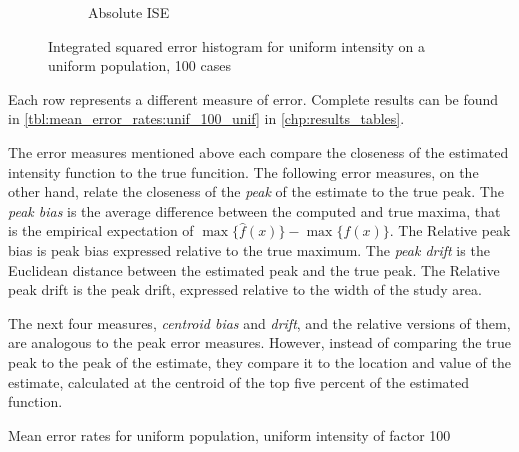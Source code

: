 \begin{figure}[htbp]
\begin{subfigure}[b]{0.45\textwidth}
    \caption{Absolute ISE}
    \end{subfigure}
    \caption[ISE: uniform on uniform]{Integrated squared error histogram for uniform intensity on a uniform population, 100 cases}
    \label{fig:ise:unif_100_unif}
\end{figure}

Each row represents a different measure of error.
Complete results can be found in \autoref{tbl:mean_error_rates:unif_100_unif} in \autoref{chp:results_tables}.

The error measures mentioned above each compare the closeness of the estimated intensity function to the true funcition.
The following error measures, on the other hand, relate the closeness of the \textit{peak} of the estimate to the true peak.
The \textit{peak bias} is the average difference between the computed and true maxima,
that is the empirical expectation of \(\max{\{\hat{f}(x)\}} - \max{\{f(x)\}}\).
The Relative peak bias is peak bias expressed relative to the true maximum.
The \textit{peak drift} is the Euclidean distance between the estimated peak and the true peak.
The Relative peak drift is the peak drift, expressed relative to the width of the study area.

The next four measures, \textit{centroid bias} and \textit{drift}, and the relative versions of them, are analogous to the peak error measures.
However, instead of comparing the true peak to the peak of the estimate, they compare it to the location and value of the estimate, calculated at the centroid of the top five percent of the estimated function.

\begin{table}[htbp]
\centering

\caption{Mean error rates for uniform population, uniform intensity of factor 100}
\label{tbl:errors:unif_100_unif}
\end{table}

